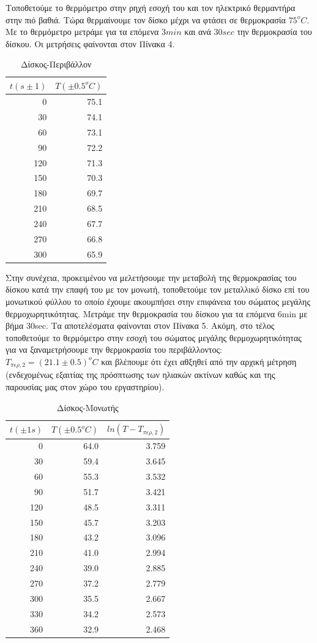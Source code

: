 \documentclass[a4paper]{article}
\begin{document}
Τοποθετούμε το θερμόμετρο στην ρηχή εσοχή του και τον ηλεκτρικό θερμαντήρα στην πιό βαθιά. Τώρα θερμαίνουμε τον δίσκο μέχρι να φτάσει σε θερμοκρασία $75^oC$.
Με το θερμόμετρο μετράμε για τα επόμενα $3min$ και ανά $30sec$ την θερμοκρασία του δίσκου. Οι μετρήσεις φαίνονται στον Πίνακα 4. 
\begin{table}[h!]
\centering
\caption{Δίσκος-Περιβάλλον }
\begin{tabular}{r|r}
$t(s\pm1)$ & $T(\pm0.5 ^oC)$ \\ 
\hline\hline
0&75.1\\
30&74.1\\
60&73.1\\
90&72.2\\
120&71.3\\
150&70.3\\
180&69.7\\
210&68.5\\
240&67.7\\
270&66.8\\
300&65.9
\end{tabular}
\end{table}

Στην συνέχεια, προκειμένου να μελετήσουμε την μεταβολή της θερμοκρασίας του δίσκου κατά την επαφή του με τον μονωτή, τοποθετούμε τον μεταλλικό δίσκο επί του μονωτικού φύλλου το οποίο έχουμε ακουμπήσει στην επιφάνεια του σώματος μεγάλης θερμοχωρητικότητας. Mετράμε την θερμοκρασία του δίσκου για τα επόμενα 6min με βήμα 30sec. Τα αποτελέσματα φαίνονται στον Πίνακα 5.
Ακόμη, στο τέλος τοποθετούμε το θερμόμετρο στην εσοχή του σώματος μεγάλης θερμοχωρητικότητας για να ξαναμετρήσουμε την θερμοκρασία του περιβάλλοντος: $T_{\pi\epsilon\rho,2}=(21.1\pm0.5)^oC$ και βλέπουμε ότι έχει αθξηθεί από την αρχική μέτρηση (ενδεχομένως εξαιτίας της πρόσπτωσης των ηλιακών ακτίνων καθώς και της παρουσίας μας στον χώρο του εργαστηρίου).
\begin{table}[h!]
\centering
\caption{ Δίσκος-Μονωτής}
\begin{tabular}{r|r|r}
$t(\pm1s)$ & $T(\pm0.5^oC)$ & $ln(T-T_{\pi\epsilon\rho,2})$  \\ 
\hline\hline
0&64.0&3.759\\
30&59.4&3.645\\
60&55.3&3.532\\
90&51.7&3.421\\
120&48.5&3.311\\
150&45.7&3.203\\
180&43.2&3.096\\
210&41.0&2.994\\
240&39.0&2.885\\
270&37.2&2.779\\
300&35.5&2.667\\
330&34.2&2.573\\
360&32.9&2.468
\end{tabular}
\end{table}
\end{document}
